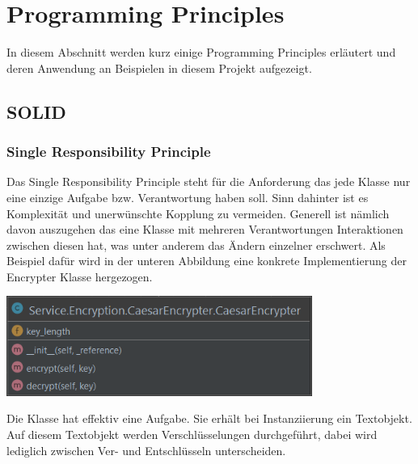 \documentclass[12pt]{article}
\begin{document}
\newpage

\section{Programming Principles}
In diesem Abschnitt werden kurz einige Programming Principles erläutert und deren Anwendung an Beispielen in diesem Projekt aufgezeigt.

\subsection{SOLID}
\subsubsection{Single Responsibility Principle}
Das Single Responsibility Principle steht für die Anforderung das jede Klasse nur eine einzige Aufgabe bzw. Verantwortung haben soll. Sinn dahinter ist es Komplexität und unerwünschte Kopplung zu vermeiden. Generell ist nämlich davon auszugehen das eine Klasse mit mehreren Verantwortungen Interaktionen zwischen diesen hat, was unter anderem das Ändern einzelner erschwert.
Als Beispiel dafür wird in der unteren Abbildung eine konkrete Implementierung der Encrypter Klasse hergezogen.
\begin{center}
	\includegraphics[width=10cm]{bilder/SRP.png}
\end{center}
Die Klasse hat effektiv eine Aufgabe. Sie erhält bei Instanziierung ein Textobjekt. Auf diesem Textobjekt werden Verschlüsselungen durchgeführt, dabei wird lediglich zwischen Ver- und Entschlüsseln unterscheiden.
\end{document}
